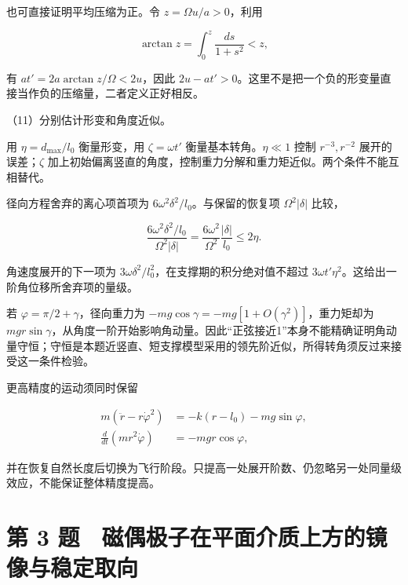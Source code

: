 \documentclass[12pt,a4paper,fontset=fandol]{ctexart}
\begin{document}
也可直接证明平均压缩为正。令 \(z=\Omega u/a>0\)，利用

\[
\arctan z=\int_0^z\frac{ds}{1+s^2}<z,
\]

有 \(at'=2a\arctan z/\Omega<2u\)，因此
\(2u-at'>0\)。这里不是把一个负的形变量直接当作负的压缩量，二者定义正好相反。

\par\noindent\begin{minipage}{\linewidth}
\setlength{\parindent}{2em}\setlength{\parskip}{.35em}
（11）分别估计形变和角度近似。

用 \(\eta=d_{\max}/l_0\) 衡量形变，用 \(\zeta=\omega t'\)
衡量基本转角。\(\eta\ll1\) 控制 \(r^{-3},r^{-2}\) 展开的误差；\(\zeta\)
加上初始偏离竖直的角度，控制重力分解和重力矩近似。两个条件不能互相替代。

径向方程舍弃的离心项首项为 \(6\omega^2\delta^2/l_0\)。与保留的恢复项
\(\Omega^2|\delta|\) 比较，

\[
\frac{6\omega^2\delta^2/l_0}{\Omega^2|\delta|}
=\frac{6\omega^2}{\Omega^2}\frac{|\delta|}{l_0}
\le2\eta.
\]

角速度展开的下一项为
\(3\omega\delta^2/l_0^2\)，在支撑期的积分绝对值不超过
\(3\omega t'\eta^2\)。这给出一阶角位移所舍弃项的量级。

若 \(\varphi=\pi/2+\gamma\)，径向重力为
\(-mg\cos\gamma=-mg[1+O(\gamma^2)]\)，重力矩却为
\(mgr\sin\gamma\)，从角度一阶开始影响角动量。因此``正弦接近1''本身不能精确证明角动量守恒；守恒是本题近竖直、短支撑模型采用的领先阶近似，所得转角须反过来接受这一条件检验。

更高精度的运动须同时保留

\[
\begin{aligned}
m(\ddot r-r\dot\varphi^2)&=-k(r-l_0)-mg\sin\varphi,\\
\frac d{dt}(mr^2\dot\varphi)&=-mgr\cos\varphi,
\end{aligned}
\]

并在恢复自然长度后切换为飞行阶段。只提高一处展开阶数、仍忽略另一处同量级效应，不能保证整体精度提高。


\end{minipage}\par
\clearpage

\section{第 3
题　磁偶极子在平面介质上方的镜像与稳定取向}\label{ux7b2c-3-ux9898-ux78c1ux5076ux6781ux5b50ux5728ux5e73ux9762ux4ecbux8d28ux4e0aux65b9ux7684ux955cux50cfux4e0eux7a33ux5b9aux53d6ux5411}
\end{document}
